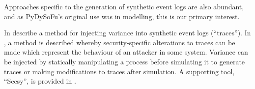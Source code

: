 Approaches specific to the generation of synthetic event logs are also
abundant\cite{stocker2013secsy, pourmasoumi2015business, Loreti_2019,
Yousfi_2015, ExecutableBPMNMitsyuk}, and as PyDySoFu's original use was in
\sociotechnical modelling, this is our primary interest. 




In \cite{stocker2013secsy, stocker2014secsy} \citeauthor[]{stocker2013secsy}
describe a method for injecting variance into synthetic event logs (``traces'').
In \cite{stocker2013secsy}, a method is described whereby security-specific
alterations to traces can be made which represent the behaviour of an attacker
in some \sociotechnical system. Variance can be injected by statically
manipulating a process before simulating it to generate traces or making
modifications to traces after simulation. A supporting tool, ``Secsy'', is
provided in \cite{stocker2014secsy}.

